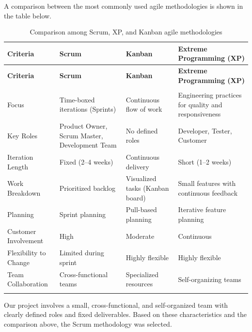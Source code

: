 A comparison between the most commonly used agile methodologies is shown in the table below.

\renewcommand{\arraystretch}{1.4}

\begin{longtable}{|>{\raggedright\arraybackslash}p{2cm}|>{\raggedright\arraybackslash}p{3.5cm}|>{\raggedright\arraybackslash}p{3.5cm}|>{\raggedright\arraybackslash}p{3.5cm}|}
\hline
\rowcolor{gray!20}
\textbf{Criteria} & \textbf{Scrum} & \textbf{Kanban} & \textbf{Extreme Programming (XP)} \\
\hline
\endfirsthead

\hline
\rowcolor{gray!20}
\textbf{Criteria} & \textbf{Scrum} & \textbf{Kanban} & \textbf{Extreme Programming (XP)} \\
\hline
\endhead

\hline
\multicolumn{4}{r}{\textit{Continued on next page}} \\
\endfoot

\hline
\endlastfoot

Focus & Time-boxed iterations (Sprints) & Continuous flow of work & Engineering practices for quality and responsiveness \\
\hline
Key Roles & Product Owner, Scrum Master, Development Team & No defined roles & Developer, Tester, Customer \\
\hline
Iteration Length & Fixed (2--4 weeks) & Continuous delivery & Short (1--2 weeks) \\
\hline
Work Breakdown & Prioritized backlog & Visualized tasks (Kanban board) & Small features with continuous feedback \\
\hline
Planning & Sprint planning & Pull-based planning & Iterative feature planning \\
\hline
Customer Involvement & High & Moderate & Continuous \\
\hline
Flexibility to Change & Limited during sprint & Highly flexible & Highly flexible \\
\hline
Team Collaboration & Cross-functional teams & Specialized resources & Self-organizing teams \\
\hline

\caption{Comparison among Scrum, XP, and Kanban agile methodologies}
\label{tab:agile}
\end{longtable}

Our project involves a small, cross-functional, and self-organized team with clearly defined roles and fixed deliverables. Based on these characteristics and the comparison above, the Scrum methodology was selected.

